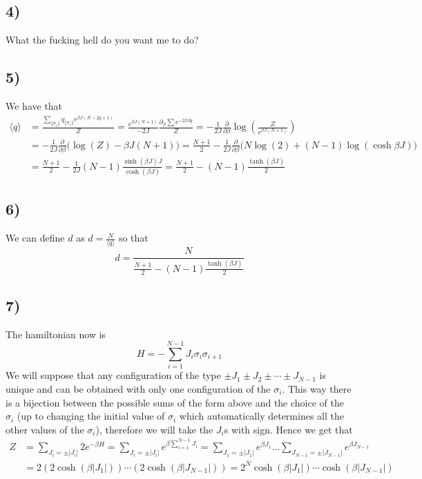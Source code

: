 \documentclass[10pt,a4paper]{book}
\newcommand{\p}{\partial}
\begin{document}
\subsection*{4)}
What the fucking hell do you want me to do?



\subsection*{5)}

We have that
\begin{align*}
\langle q\rangle&=\frac{\sum_{\{\sigma_i\}}q_{\{\sigma_i\}}e^{\beta J(N-2q+1)}}{Z}=\frac{e^{\beta J(N+1)}}{-2J}\frac{\p_{\beta} \sum e^{-2\beta J q}}{Z}=-\frac{1}{2J}\frac{\p}{\p\beta}\log(\frac{Z}{e^{\beta J(N+1)}})\\
&=-\frac{1}{2J}\frac{\p}{\p\beta}\bigg(\log(Z)-\beta J(N+1)\bigg)=\frac{N+1}{2}-\frac{1}{2J}\frac{\p}{\p\beta}\bigg(N\log(2)+(N-1)\log(\cosh\beta J)\bigg)\\
&=\frac{N+1}{2}-\frac{1}{2J}(N-1)\frac{\sinh(\beta J)J}{\cosh(\beta J)}=\frac{N+1}{2}-(N-1)\frac{\tanh(\beta J)}{2}
\end{align*}

\subsection*{6)}
We can define $d$ as $d=\frac{N}{\langle q\rangle} $
so that 
$$d=\frac{N}{\frac{N+1}{2}-(N-1)\frac{\tanh(\beta J)}{2}}$$

\subsection*{7)}
The hamiltonian now is 
$$H=-\sum_{i=1}^{N-1}J_i\sigma_i\sigma_{i+1}$$
We will suppose that any configuration of the type $\pm J_1\pm J_2\pm\cdots\pm J_{N-1}$ is unique and can be obtained with only one configuration of the $\sigma_i$. This way there is a bijection between the possible sums of the form above and the choice of the $\sigma_i$ (up to changing the initial value of $\sigma_i$ which automatically determines all the other values of the $\sigma_i$), therefore we will take the $J_i$s with sign. Hence we get that
\begin{align*}
Z&=\sum_{J_i=\pm |J_i|} 2e^{-\beta H}=\sum_{J_i=\pm|J_i|}e^{\beta\sum_{i=1}^{N-1}J_i}=\sum_{J_1=\pm|J_1|}e^{\beta J_1}\ldots \sum_{J_{N-1}=\pm|J_{N-1}|}e^{\beta J_{N-1}}\\
&=2(2\cosh(\beta |J_1|))\cdots (2\cosh(\beta |J_{N-1}|))=2^{N}\cosh(\beta |J_1|)\cdots\cosh(\beta |J_{N-1}|)
\end{align*}
\end{document}
